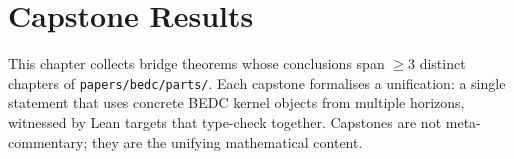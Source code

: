 \chapter{Capstone Results}
\label{ch:capstones}

This chapter collects bridge theorems whose conclusions span $\geq 3$
distinct chapters of \texttt{papers/bedc/parts/}. Each capstone formalises
a unification: a single statement that uses concrete BEDC kernel objects
from multiple horizons, witnessed by Lean targets that type-check
together. Capstones are not meta-commentary; they are the unifying
mathematical content.


